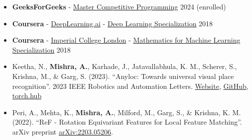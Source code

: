     \begin{itemize}
        \item {\bf GeeksForGeeks}
            - \href{https://www.geeksforgeeks.org/courses/competitive-programming-cp}{Master Competitive Programming}
            \hfill 2024 (enrolled)
        \item {\bf Coursera} 
            - \href{https://www.coursera.org/specializations/deep-learning}{DeepLearning.ai} 
            - \href{https://www.dropbox.com/scl/fi/4khn773do9we5ma3u5zcm/Coursera-Deep-Learning-Specialization-deeplearning-ai.pdf?rlkey=hdllh5b8lrrpzmd4p0ax0y0ht&st=893z922w&dl=0}{Deep Learning Specialization} 
            \hfill 2018
        \item {\bf Coursera}
            - \href{https://www.coursera.org/specializations/mathematics-machine-learning}{Imperial College London}
            - \href{https://www.dropbox.com/scl/fi/ja4sq235qr3eqtjid7xh6/Coursera-Mathematics-for-Machine-Learning-Imperial-College-London.pdf?rlkey=s2s5hbmvk4moagv2uf8c0bokw&st=lelnfh56&dl=0}{Mathematics for Machine Learning Specialization}
            \hfill 2018
    \end{itemize}
    \begin{itemize}
        \setlength{\itemsep}{0mm}
        \item Keetha, N., {\bf Mishra, A.}, Karhade, J., Jatavallabhula, K.
            M., Scherer, S., Krishna, M., \& Garg, S. (2023). ``Anyloc:
            Towards universal visual place recognition''. 2023 IEEE
            Robotics and Automation Letters.
            \href{https://anyloc.github.io/}{Website},
            \href{https://github.com/AnyLoc/AnyLoc}{GitHub},
            \href{https://github.com/AnyLoc/DINO}{torch.hub}
        \item Peri, A., Mehta, K., {\bf Mishra, A.}, Milford, M., Garg, S., 
            \& Krishna, K. M. (2022). ``ReF - Rotation Equivariant 
            Features for Local Feature Matching''. arXiv preprint 
            \href{https://arxiv.org/abs/2203.05206}{arXiv:2203.05206}.
    \end{itemize}


